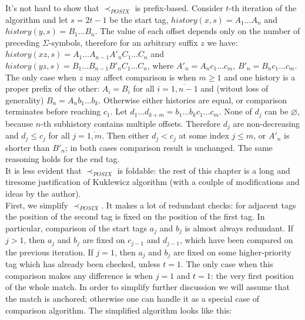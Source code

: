 \documentclass{article}
\newcommand{\Xeq}{\!=\!}
\theoremstyle{definition}
\begin{document}
\begin{multicols}{2}
It's not hard to show that $\prec_{POSIX}$ is prefix-based.
Consider $t$-th iteration of the algorithm and let $s \Xeq 2t \!-\! 1$ be the start tag,
$history(x, s) \Xeq A_1 \dots A_n$ and $history(y, s) \Xeq B_1 \dots B_n$.
The value of each offset depends only on the number of preceding $\Sigma$-symbols,
therefore for an arbitrary suffix $z$ we have:
$history(xz, s) \Xeq A_1 \dots A_{n-1} A'_n C_1 \dots C_n$ and
$history(yz, s) \Xeq B_1 \dots B_{n-1} B'_n C_1 \dots C_n$,
where $A'_n \Xeq A_n c_1 \dots c_m$, $B'_n \Xeq B_n c_1 \dots c_m$.
The only case when $z$ may affect comparison is when $m \!\geq\! 1$ and one history is a proper prefix of the other:
$A_i \Xeq B_i$ for all $i \Xeq \overline{1,n-1}$ and (witout loss of generality) $B_n \Xeq A_n b_1 \dots b_k$.
Otherwise either histories are equal, or comparison terminates before reaching $c_1$.
Let $d_1 \dots d_{k+m} \Xeq b_1 \dots b_k c_1 \dots c_m$.
None of $d_j$ can be $\varnothing$, because $n$-th subhistory contains multiple offsets.
Therefore $d_j$ are non-decreasing and $d_j \!\leq\! c_j$ for all $j \Xeq \overline{1, m}$.
Then either $d_j \!<\! c_j$ at some index $j \!\leq\! m$, or $A'_n$ is shorter than $B'_n$; in both cases comparison result is unchanged.
The same reasoning holds for the end tag.
\\

It is less evident that $\prec_{POSIX}$ is foldable:
the rest of this chapter is a long and tiresome justification of Kuklewicz algorithm
(with a coulple of modifications and ideas by the author).
\\

First, we simplify $\prec_{POSIX}$.
It makes a lot of redundant checks:
for adjacent tags the position of the second tag is fixed on the position of the first tag.
In particular, comparison of the start tags $a_j$ and $b_j$ is almost always redundant.
If $j \!>\! 1$, then $a_j$ and $b_j$ are fixed on $c_{j-1}$ and $d_{j-1}$, which have been compared on the previous iteration.
If $j \Xeq 1$, then $a_j$ and $b_j$ are fixed on some higher-priority tag which has already been checked, unless $t \Xeq 1$.
The only case when this comparison makes any difference is when $j \Xeq 1$ and $t \Xeq 1$:
the very first position of the whole match.
In order to simplify further discussion we will assume that the match is anchored;
otherwise one can handle it as a special case of comparison algorithm.
The simplified algorithm looks like this:
\\


\end{multicols}
\end{document}
